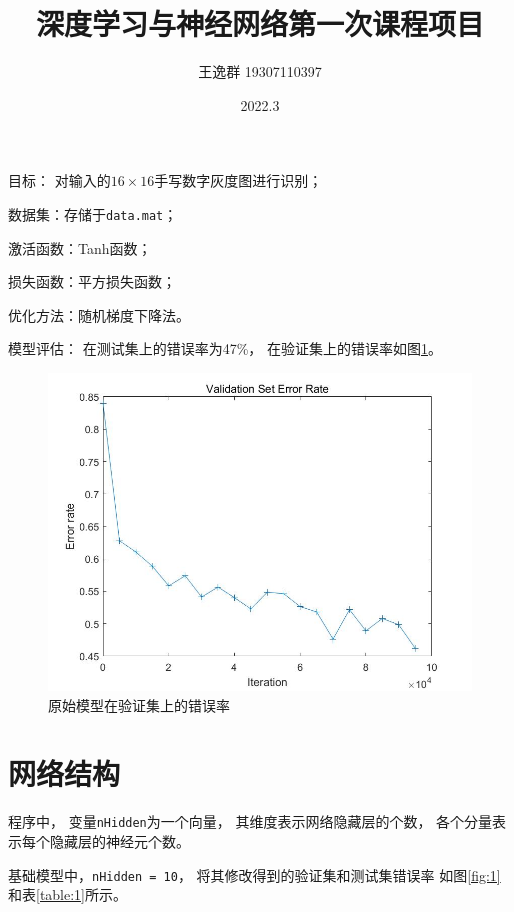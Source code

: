 \documentclass{article}
\title{深度学习与神经网络第一次课程项目}
\author{王逸群 19307110397}
\date{2022.3}
\begin{document}
\maketitle

目标：
对输入的$ 16 \times 16 $手写数字灰度图进行识别；

数据集：存储于\verb|data.mat|；

激活函数：Tanh函数；

损失函数：平方损失函数；

优化方法：随机梯度下降法。

模型评估：
在测试集上的错误率为47\%，
在验证集上的错误率如图\ref{fig:0}。

\begin{figure}[h]
\includegraphics[width=\textwidth]{0.jpg}
\caption{原始模型在验证集上的错误率}
\label{fig:0}
\end{figure}

\section{网络结构}

程序中，
变量\verb|nHidden|为一个向量，
其维度表示网络隐藏层的个数，
各个分量表示每个隐藏层的神经元个数。

基础模型中，\verb|nHidden = 10|，
将其修改得到的验证集和测试集错误率
如图\ref{fig:1}和表\ref{table:1}所示。
\end{document}
